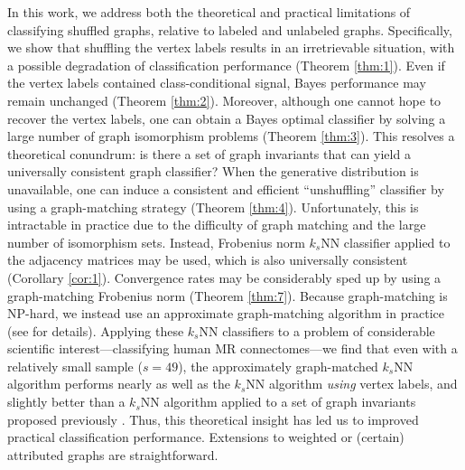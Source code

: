 \documentclass[10pt,journal,cspaper,compsoc]{IEEEtran}
\begin{document}
In this work, we address both the theoretical and practical limitations of classifying shuffled graphs, relative to labeled and unlabeled graphs.  Specifically, we show that shuffling the vertex labels results in an irretrievable situation, with a possible degradation of classification performance (Theorem \ref{thm:1}). Even if the vertex labels contained class-conditional signal, Bayes performance may remain unchanged (Theorem \ref{thm:2}).  Moreover, although one cannot hope to recover the vertex labels, one can obtain a Bayes optimal classifier by solving a large number of graph isomorphism problems (Theorem \ref{thm:3}).  This resolves a theoretical conundrum: is there a set of graph invariants that can yield a universally consistent graph classifier?  When the generative distribution is unavailable, one can induce a consistent and efficient ``unshuffling'' classifier by using a graph-matching strategy (Theorem \ref{thm:4}).  Unfortunately, this is intractable in practice due to the difficulty of graph matching and the large number of isomorphism sets.  Instead, Frobenius norm $k_s$NN classifier applied to the adjacency matrices may be used, which is also universally consistent (Corollary \ref{cor:1}).   Convergence rates may be considerably sped up by using a graph-matching Frobenius norm (Theorem \ref{thm:7}).  Because graph-matching is NP-hard, we instead use an approximate graph-matching algorithm in practice (see \cite{VP11_QAP} for details).  Applying these $k_s$NN classifiers to a problem of considerable scientific interest---classifying human MR connectomes---we find that even with a relatively small sample ($s=49$), the approximately graph-matched $k_s$NN algorithm performs nearly as well as the $k_s$NN algorithm \emph{using} vertex labels, and slightly better than a $k_s$NN algorithm applied to a set of graph invariants proposed previously \cite{PCP10}.  Thus, this theoretical insight has led us to improved practical classification performance.  Extensions to weighted or (certain) attributed graphs are straightforward.

\end{document}
